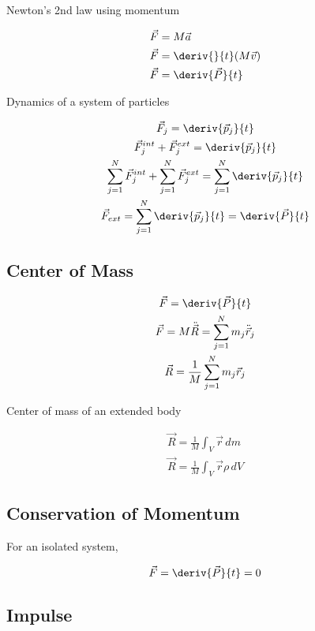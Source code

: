 \documentclass{notes}
\begin{document}
Newton's 2nd law using momentum

\begin{align}
    \vec{F} &= M\vec{a}\\
    \vec{F} &= \deriv{}{t}(M\vec{v})\\
    \vec{F} &= \deriv{\vec{P}}{t}
\end{align}

Dynamics of a system of particles

\begin{gather}
    \vec{F}_j = \deriv{\vec{p}_j}{t}\\
    \vec{F}_j^{int} + \vec{F}_j^{ext} = \deriv{\vec{p}_j}{t}\\
    \sum_{j=1}^{N}\vec{F}_j^{int} + \sum_{j=1}^{N}\vec{F}_j^{ext} = \sum_{j=1}^{N}\deriv{\vec{p}_j}{t}\\
    \vec{F}_{ext} = \sum_{j=1}^{N} \deriv{\vec{p}_j}{t} = \deriv{\vec{P}}{t}
\end{gather}

\subsection{Center of Mass}

\begin{gather}
    \vec{F} = \deriv{\vec{P}}{t}\\
    \vec{F} = M\ddot{\vec{R}} = \sum_{j=1}^{N}m_j\ddot{\vec{r}}_j\\
    \vec{R} = \frac{1}{M}\sum_{j=1}^{N}m_j\vec{r}_j
\end{gather}

Center of mass of an extended body

\begin{gather}
    \vec{R} = \frac{1}{M}\int_V\vec{r}\,dm\\
    \vec{R} = \frac{1}{M}\int_V\vec{r}\rho \, dV
\end{gather}

\subsection{Conservation of Momentum}

For an isolated system,

\[\vec{F} = \deriv{\vec{P}}{t} = 0\]

\subsection{Impulse}
\end{document}
